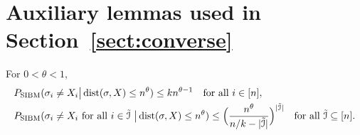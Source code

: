 \documentclass{article}
\begin{document}
\appendix
\section{Auxiliary lemmas used in Section~\ref{sect:converse}}\label{ap:6}

\begin{lemma} \label{lm:bq}
For $0<\theta<1$,
\begin{align}
& P_{\operatorname{SIBM}}(\sigma_i \neq X_i
\big| \operatorname{dist}(\sigma,X) \le n^\theta) \le k n^{\theta-1}
\quad \text{for all~} i\in[n] , \label{eq:l1}\\
& P_{\operatorname{SIBM}}(\sigma_i \neq X_i \text{~for all~}  i\in\tilde{\mathcal{I}}
~\big| \operatorname{dist}(\sigma,X) \le n^\theta) \le \Big(\frac{n^\theta}{n/k - |\tilde{\mathcal{I}}|}
\Big)^{|\tilde{\mathcal{I}}|}
\quad \text{for all~} \tilde{\mathcal{I}}\subseteq [n] .   \label{eq:l2}
\end{align}
\end{lemma}
\end{document}

